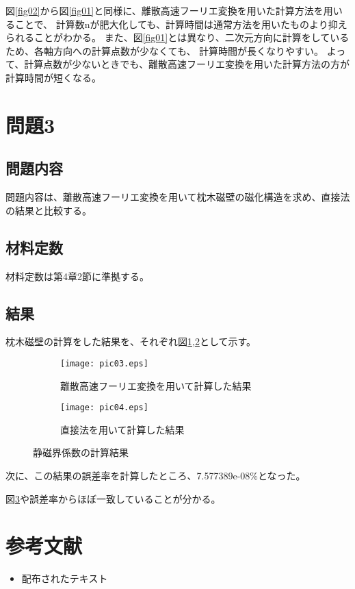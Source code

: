 \documentclass{jsarticle}
\begin{document}
図\ref{fig02}から図\ref{fig01}と同様に、離散高速フーリエ変換を用いた計算方法を用いることで、
計算数nが肥大化しても、計算時間は通常方法を用いたものより抑えられることがわかる。
また、図\ref{fig01}とは異なり、二次元方向に計算をしているため、各軸方向への計算点数が少なくても、
計算時間が長くなりやすい。
よって、計算点数が少ないときでも、離散高速フーリエ変換を用いた計算方法の方が計算時間が短くなる。

\section{問題3}
\subsection{問題内容}
問題内容は、離散高速フーリエ変換を用いて枕木磁壁の磁化構造を求め、直接法の結果と比較する。

\subsection{材料定数}
材料定数は第4章2節に準拠する。

\subsection{結果}
枕木磁壁の計算をした結果を、それぞれ図\ref{fig03_1},\ref{fig03_2}として示す。
\begin{figure}[H]
	\centering
	\begin{subfigure}{0.49\columnwidth}
		\centering
		\texttt{[image: pic03.eps]}
		\caption{離散高速フーリエ変換を用いて計算した結果}
		\label{fig03_1}
	\end{subfigure}
	\begin{subfigure}{0.49\columnwidth}
		\centering
		\texttt{[image: pic04.eps]}
		\caption{直接法を用いて計算した結果}
		\label{fig03_2}
	\end{subfigure}
	\caption{静磁界係数の計算結果}
	\label{fig03}
\end{figure}

次に、この結果の誤差率を計算したところ、7.577389e-08$\%$となった。

図\ref{fig03}や誤差率からほぼ一致していることが分かる。

\section{参考文献}

\begin{itemize}
  \item 配布されたテキスト
\end{itemize}
\end{document}
